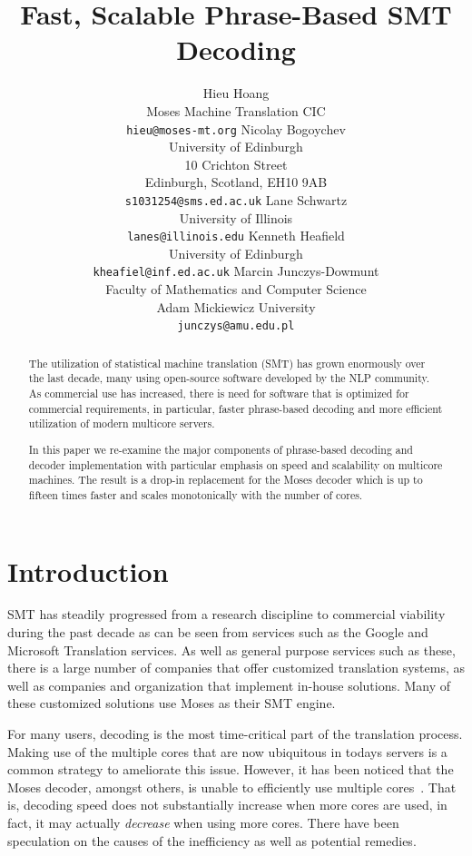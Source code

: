 \documentclass[11pt]{article}
\title{Fast, Scalable Phrase-Based SMT Decoding}
\author{Hieu Hoang\\
	    Moses Machine Translation CIC\\
	    {\tt hieu@moses-mt.org}
	  \And
	Nicolay Bogoychev\\
  	University of Edinburgh\\
  	10 Crichton Street\\
  	Edinburgh, Scotland, EH10 9AB\\
  {\tt s1031254@sms.ed.ac.uk}
	  \And
	Lane Schwartz\\
  	University of Illinois\\
  {\tt lanes@illinois.edu}
	  \AND
	Kenneth Heafield\\
  	University of Edinburgh\\
  {\tt kheafiel@inf.ed.ac.uk}
	  \And
	Marcin Junczys-Dowmunt\\
	Faculty of Mathematics and Computer Science \\
	Adam Mickiewicz University\\
  {\tt junczys@amu.edu.pl}
	}
\date{}
\begin{document}
\maketitle

\begin{abstract}
The utilization of statistical machine translation (SMT) has grown enormously over the last decade, many using open-source software developed by the NLP community. As commercial use has increased, there is need for  software that is optimized for commercial requirements, in particular, faster phrase-based decoding and more efficient utilization of modern multicore servers.

In this paper we re-examine the major components of phrase-based decoding and decoder implementation with particular emphasis on speed and scalability on multicore machines. The result is a drop-in replacement for the Moses decoder which is up to fifteen times faster and scales monotonically with the number of cores. 

\end{abstract}

\section{Introduction}

SMT has steadily progressed from a research discipline to commercial viability during the past decade as can be seen from services such as the Google and Microsoft Translation services. As well as general purpose services such as these, there is a large number of companies that offer customized translation systems, as well as  companies and organization that implement in-house solutions. Many of these customized solutions use Moses as their SMT engine.

For many users, decoding is the most time-critical part of the translation process. Making use of the multiple cores that are now ubiquitous in todays servers is a common strategy to ameliorate this issue. However, it has been noticed that the Moses decoder, amongst others, is unable to efficiently use multiple cores~\cite{mfernandez2016boosting}. That is, decoding speed does not substantially increase when more cores are used, in fact, it may actually \emph{decrease} when using more cores. There have been speculation on the causes of the inefficiency as well as potential remedies. 
\end{document}
